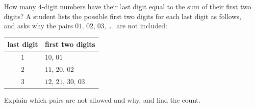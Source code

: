 How many $4$-digit numbers have their last digit equal to the sum of their first two digits? A student lists the possible first two digits for each last digit as follows, and asks why the pairs $01$, $02$, $03$, \dots\ are not included:
\begin{center}
\begin{tabular}{c|l}
last digit & first two digits\\ \hline
$1$ & $10$, $01$\\
$2$ & $11$, $20$, $02$\\
$3$ & $12$, $21$, $30$, $03$
\end{tabular}
\end{center}
Explain which pairs are not allowed and why, and find the count.
